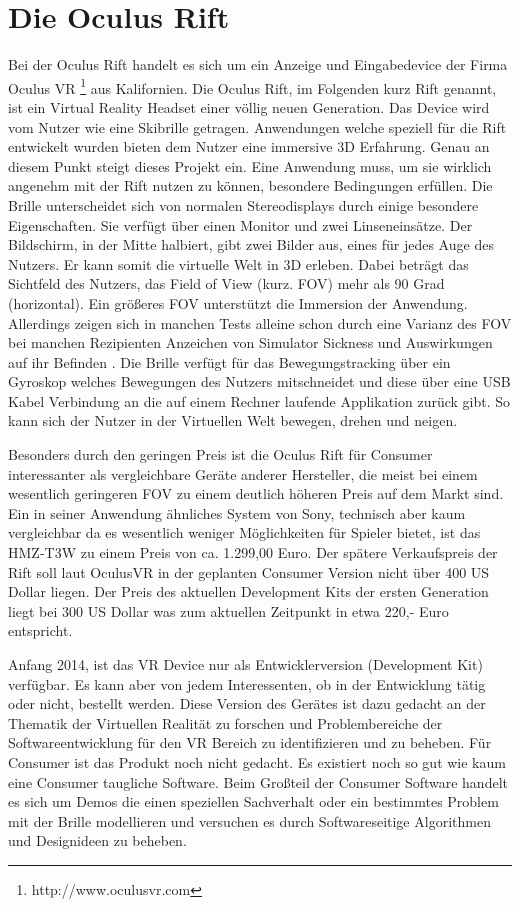 \documentclass[pagesize, paper=a4, fontsize=12pt,titlepage=true, headings=small, headnosepline, abstractoff, liststotoc, nochapterprefix, plainheadsepline, twoside]{scrreprt}
\begin{document}
\section{Die Oculus Rift}
Bei der Oculus Rift handelt es sich um ein Anzeige und Eingabedevice der Firma Oculus VR \footnote{http://www.oculusvr.com} aus Kalifornien. Die Oculus Rift, im Folgenden kurz Rift genannt, ist ein Virtual Reality Headset einer völlig neuen Generation. Das Device wird vom Nutzer wie eine Skibrille getragen. Anwendungen welche speziell für die Rift entwickelt wurden bieten dem Nutzer eine immersive 3D Erfahrung. Genau an diesem Punkt steigt dieses Projekt ein. Eine Anwendung muss, um sie wirklich angenehm mit der Rift nutzen zu können, besondere Bedingungen erfüllen. Die Brille unterscheidet sich von normalen Stereodisplays durch einige besondere Eigenschaften. Sie verfügt über einen Monitor und zwei Linseneinsätze. Der Bildschirm, in der Mitte halbiert, gibt zwei Bilder aus, eines für jedes Auge des Nutzers. Er kann somit die virtuelle Welt in 3D erleben. Dabei beträgt das Sichtfeld des Nutzers, das Field of View (kurz. FOV) mehr als 90 Grad (horizontal). Ein größeres FOV unterstützt die Immersion der Anwendung. Allerdings zeigen sich in manchen Tests alleine schon durch eine Varianz des FOV bei manchen Rezipienten Anzeichen von Simulator Sickness und Auswirkungen auf ihr Befinden \cite{SeayKrumHodgesRibarsky2001}. Die Brille verfügt für das Bewegungstracking über ein Gyroskop welches Bewegungen des Nutzers mitschneidet und diese über eine USB Kabel Verbindung an die auf einem Rechner laufende Applikation zurück gibt. So kann sich der Nutzer in der Virtuellen Welt bewegen, drehen und neigen.

Besonders durch den geringen Preis ist die Oculus Rift für Consumer interessanter als vergleichbare Geräte anderer Hersteller, die meist bei einem wesentlich geringeren FOV zu einem deutlich höheren Preis auf dem Markt sind. Ein in seiner Anwendung ähnliches System von Sony, technisch aber kaum vergleichbar da es wesentlich weniger Möglichkeiten für Spieler bietet, ist das HMZ-T3W zu einem Preis von ca. 1.299,00 Euro. Der spätere Verkaufspreis der Rift soll laut OculusVR in der geplanten Consumer Version nicht über 400 US Dollar liegen. Der Preis des aktuellen Development Kits der ersten Generation liegt bei 300 US Dollar was zum aktuellen Zeitpunkt in etwa 220,- Euro entspricht.

Anfang 2014, ist das VR Device nur als Entwicklerversion (Development Kit) verfügbar. Es kann aber von jedem Interessenten, ob in der Entwicklung tätig oder nicht, bestellt werden. Diese Version des Gerätes ist dazu gedacht an der Thematik der Virtuellen Realität zu forschen und Problembereiche der Softwareentwicklung für den VR Bereich zu identifizieren und zu beheben. Für Consumer ist das Produkt noch nicht gedacht. Es existiert noch so gut wie kaum eine Consumer taugliche Software. Beim Großteil der Consumer Software handelt es sich um Demos die einen speziellen Sachverhalt oder ein bestimmtes Problem mit der Brille modellieren und versuchen es durch Softwareseitige Algorithmen und Designideen zu beheben.
\end{document}
